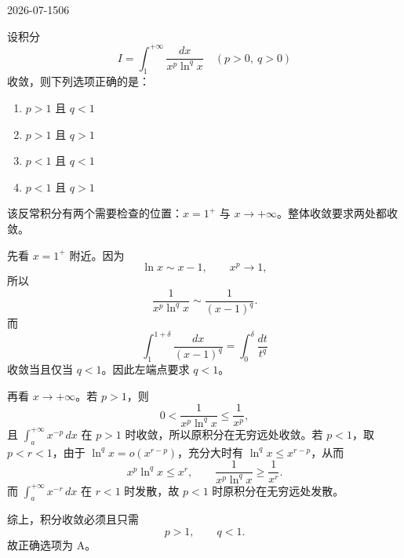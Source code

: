 \begin{mistake}{2026-07-15}{06}

\begin{problemcontent}
设积分
\[
I=\int_1^{+\infty}\frac{dx}{x^p\ln^q x}\quad (p>0,\ q>0)
\]
收敛，则下列选项正确的是：
\begin{enumerate}
  \item[A.] \(p>1\) 且 \(q<1\)
  \item[B.] \(p>1\) 且 \(q>1\)
  \item[C.] \(p<1\) 且 \(q<1\)
  \item[D.] \(p<1\) 且 \(q>1\)
\end{enumerate}
\end{problemcontent}

\begin{solutioncontent}
该反常积分有两个需要检查的位置：\(x=1^+\) 与 \(x\to+\infty\)。整体收敛要求两处都收敛。

先看 \(x=1^+\) 附近。因为
\[
\ln x\sim x-1,\qquad x^p\to 1,
\]
所以
\[
\frac{1}{x^p\ln^q x}\sim \frac{1}{(x-1)^q}.
\]
而
\[
\int_1^{1+\delta}\frac{dx}{(x-1)^q}
=\int_0^\delta \frac{dt}{t^q}
\]
收敛当且仅当 \(q<1\)。因此左端点要求 \(q<1\)。

再看 \(x\to+\infty\)。若 \(p>1\)，则
\[
0<\frac{1}{x^p\ln^q x}\leq \frac{1}{x^p},
\]
且 \(\int_a^{+\infty}x^{-p}\,dx\) 在 \(p>1\) 时收敛，所以原积分在无穷远处收敛。若 \(p<1\)，取 \(p<r<1\)，由于 \(\ln^q x=o(x^{r-p})\)，充分大时有 \(\ln^q x\leq x^{r-p}\)，从而
\[
x^p\ln^q x\leq x^r,
\qquad
\frac{1}{x^p\ln^q x}\geq \frac{1}{x^r}.
\]
而 \(\int_a^{+\infty}x^{-r}\,dx\) 在 \(r<1\) 时发散，故 \(p<1\) 时原积分在无穷远处发散。

综上，积分收敛必须且只需
\[
p>1,\qquad q<1.
\]
故正确选项为 A。
\end{solutioncontent}


\end{mistake}
